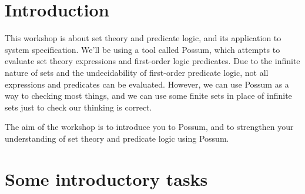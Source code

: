 \documentclass{article}
\begin{document}
%
\lstset{language=}

\section*{Introduction}

This workshop is about set theory and predicate logic, and its application to system specification. We'll be using a tool called Possum, which attempts to evaluate set theory expressions and first-order logic predicates.  Due to the infinite nature of sets and the undecidability of first-order predicate logic, not all expressions and predicates can be evaluated. However, we can use Possum as a way to checking most things, and we can use some finite sets in place of infinite sets just to check our thinking is correct.

The aim of the workshop is to introduce you to Possum, and to strengthen your understanding of set theory and predicate logic using Possum.


\section*{Some introductory tasks}
\end{document}
